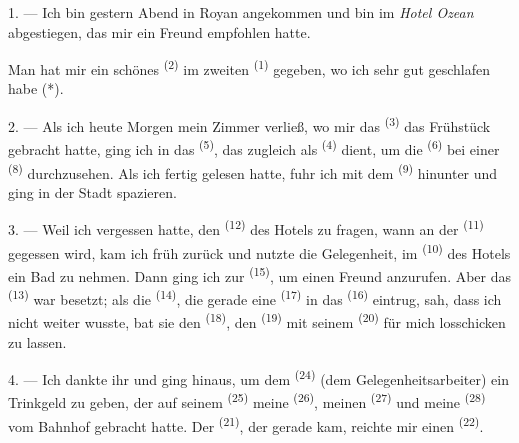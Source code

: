 
\VUsaut{3.0mm}
\VUsaut{1.6mm}
\VUsaut{2.0mm}
\VUsaut{3.4mm}

1. --- Ich bin gestern Abend in Royan angekommen und bin im \textit{Hotel Ozean}
abgestiegen, das mir ein Freund empfohlen hatte.

Man hat mir ein schönes  \textsuperscript{(2)} im zweiten
 \textsuperscript{(1)} gegeben, wo ich sehr gut geschlafen habe (*).

2. --- Als ich heute Morgen mein Zimmer verließ, wo mir das 
\textsuperscript{(3)} das Frühstück gebracht hatte, ging ich in das
 \textsuperscript{(5)}, das zugleich als 
\textsuperscript{(4)} dient, um die  \textsuperscript{(6)} bei einer
 \textsuperscript{(8)} durchzusehen. Als ich fertig gelesen hatte,
fuhr ich mit dem  \textsuperscript{(9)} hinunter und ging in der
Stadt spazieren.

3. --- Weil ich vergessen hatte, den  \textsuperscript{(12)} des
Hotels zu fragen, wann an der  \textsuperscript{(11)} gegessen
wird, kam ich früh zurück und nutzte die Gelegenheit, im 
\textsuperscript{(10)} des Hotels ein Bad zu nehmen. Dann ging ich zur
 \textsuperscript{(15)}, um einen Freund anzurufen. Aber das
 \textsuperscript{(13)} war besetzt; als die 
\textsuperscript{(14)}, die gerade eine  \textsuperscript{(17)} in
das  \textsuperscript{(16)} eintrug, sah, dass ich nicht weiter
wusste, bat sie den  \textsuperscript{(18)}, den 
\textsuperscript{(19)} mit seinem  \textsuperscript{(20)} für mich
losschicken zu lassen.

4. --- Ich dankte ihr und ging hinaus, um dem 
\textsuperscript{(24)} (dem Gelegenheitsarbeiter) ein Trinkgeld zu geben, der auf seinem
 \textsuperscript{(25)} meine 
\textsuperscript{(26)}, meinen  \textsuperscript{(27)} und meine
 \textsuperscript{(28)} vom Bahnhof gebracht hatte. Der
 \textsuperscript{(21)}, der gerade kam, reichte mir einen
 \textsuperscript{(22)}.

